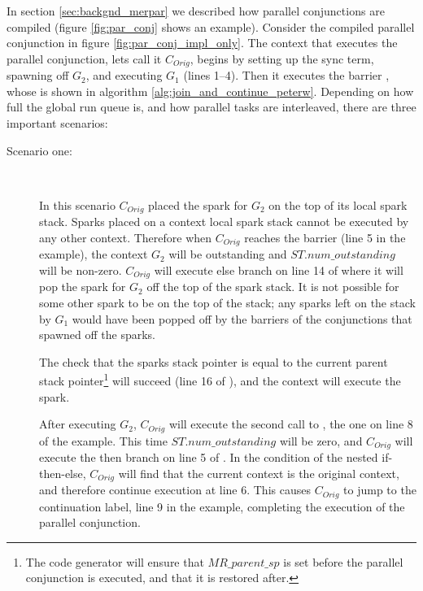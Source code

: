 In section \ref{sec:backgnd_merpar} we described how parallel
conjunctions are compiled
(figure \ref{fig:par_conj} shows an example).
Consider the compiled parallel conjunction in figure
\ref{fig:par_conj_impl_only}.
The context that executes the parallel conjunction,
lets call it $C_{Orig}$,
begins by
setting up the sync term,
spawning off $G_2$,
and executing $G_1$ (lines 1--4).
Then it executes the barrier \joinandcontinue,
whose is shown in
algorithm \ref{alg:join_and_continue_peterw}.
Depending on how full the global run queue is,
and how parallel tasks are interleaved,
there are three important scenarios:

\begin{description}

    \item[Scenario one:]~

    In this scenario $C_{Orig}$ placed the spark for $G_2$ on the top of its
    local spark stack.
    Sparks placed on a context local spark stack cannot be executed by any
    other context.
    Therefore when $C_{Orig}$ reaches the \joinandcontinue barrier
    (line 5 in the example),
    the context $G_2$ will be outstanding and $ST.num\_outstanding$ will be
    non-zero.
    $C_{Orig}$ will execute else branch on line 14 of \joinandcontinue
    where it will pop the spark for $G_2$ off the top of the spark stack.
    It is not possible for some other spark to be on the top of the stack;
    any sparks left on the stack by $G_1$ would have been popped off by 
    the \joinandcontinue barriers of the conjunctions that spawned off the
    sparks.

    The check that the sparks stack pointer is equal to the current
    parent stack pointer\footnote{
        The code generator will ensure that $MR\_parent\_sp$ is set
        before the parallel conjunction is executed,
        and that it is restored after.}
    will succeed (line 16 of \joinandcontinue),
    and the context will execute the spark.

    After executing $G_2$,
    $C_{Orig}$ will execute the second call to \joinandcontinue,
    the one on line 8 of the example.
    This time $ST.num\_outstanding$ will be zero,
    and $C_{Orig}$ will execute the then branch on line 5 of
    \joinandcontinue.
    In the condition of the nested if-then-else,
    $C_{Orig}$ will find that the current context is the original context,
    and therefore continue execution at line 6.
    This causes $C_{Orig}$ to jump to the continuation label,
    line 9 in the example,
    completing the execution of the parallel conjunction.


\end{description}
